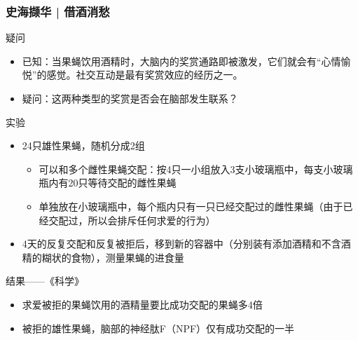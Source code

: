 \begin{frame}
  \frametitle{史海撷华 | 借酒消愁}
  \vspace{-0.5em}
  \begin{block}{疑问}
    \begin{itemize}
      \item 已知：当果蝇饮用酒精时，大脑内的奖赏通路即被激发，它们就会有“心情愉悦”的感觉。社交互动是最有奖赏效应的经历之一。
      \item 疑问：这两种类型的奖赏是否会在脑部发生联系？
  \vspace{-0.5em}
    \end{itemize}
  \end{block}
  \vspace{-0.5em}
  \pause
  \begin{block}{实验}
    \begin{itemize}
      \item 24只雄性果蝇，随机分成2组
        \begin{itemize}
          \item 可以和多个雌性果蝇交配：按4只一小组放入3支小玻璃瓶中，每支小玻璃瓶内有20只等待交配的雌性果蝇
          \item 单独放在小玻璃瓶中，每个瓶内只有一只已经交配过的雌性果蝇（由于已经交配过，所以会排斥任何求爱的行为）
        \end{itemize}
  \vspace{-0.5em}
      \item 4天的反复交配和反复被拒后，移到新的容器中（分别装有添加酒精和不含酒精的糊状的食物），测量果蝇的进食量
  \vspace{-0.5em}
    \end{itemize}
  \end{block}
  \vspace{-0.5em}
  \pause
  \begin{block}{结果——《科学》}
    \begin{itemize}
      \item 求爱被拒的果蝇饮用的酒精量要比成功交配的果蝇多4倍
      \item 被拒的雄性果蝇，脑部的神经肽F（NPF）仅有成功交配的一半
  \vspace{-0.7em}
    \end{itemize}
  \end{block}
\end{frame}

